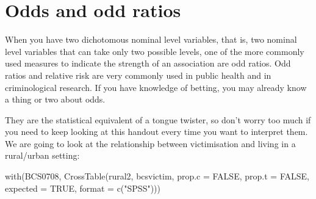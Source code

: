 \documentclass[
]{book}
\newenvironment{Shaded}{\begin{snugshade}}{\end{snugshade}}
\newcommand{\AttributeTok}[1]{\textcolor[rgb]{0.77,0.63,0.00}{#1}}
\newcommand{\ConstantTok}[1]{\textcolor[rgb]{0.00,0.00,0.00}{#1}}
\newcommand{\FunctionTok}[1]{\textcolor[rgb]{0.00,0.00,0.00}{#1}}
\newcommand{\NormalTok}[1]{#1}
\newcommand{\StringTok}[1]{\textcolor[rgb]{0.31,0.60,0.02}{#1}}
\begin{document}
\hypertarget{odds-and-odd-ratios}{%
\section{Odds and odd ratios}\label{odds-and-odd-ratios}}

When you have two dichotomous nominal level variables, that is, two nominal level variables that can take only two possible levels, one of the more commonly used measures to indicate the strength of an association are odd ratios. Odd ratios and relative risk are very commonly used in public health and in criminological research. If you have knowledge of betting, you may already know a thing or two about odds.

They are the statistical equivalent of a tongue twister, so don't worry too much if you need to keep looking at this handout every time you want to interpret them. We are going to look at the relationship between victimisation and living in a rural/urban setting:

\begin{Shaded}
\begin{Highlighting}[]
\FunctionTok{with}\NormalTok{(BCS0708, }\FunctionTok{CrossTable}\NormalTok{(rural2, bcsvictim, }\AttributeTok{prop.c =} \ConstantTok{FALSE}\NormalTok{, }\AttributeTok{prop.t =} \ConstantTok{FALSE}\NormalTok{, }\AttributeTok{expected =} \ConstantTok{TRUE}\NormalTok{, }\AttributeTok{format =} \FunctionTok{c}\NormalTok{(}\StringTok{"SPSS"}\NormalTok{)))}
\end{Highlighting}
\end{Shaded}
\end{document}
